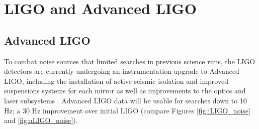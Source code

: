 %
\section{LIGO and Advanced LIGO}

 
\subsection{Advanced LIGO}

To combat noise sources that limited \gw{}  searches in previous science runs, the LIGO detectors are currently undergoing an instrumentation upgrade to Advanced LIGO, including the installation of active seismic isolation and improved suspensions systems for each mirror as well as improvements to the optics and laser subsystems \cite{Harry-aLIGO}. Advanced LIGO data will be usable for \gw{}  searches down to 10 Hz; a 30 Hz improvement over initial LIGO (compare Figures \ref{fig:iLIGO_noise} and \ref{fig:aLIGO_noise}). 

